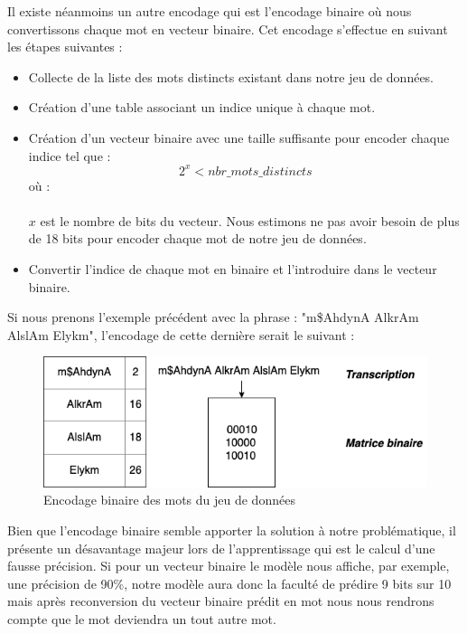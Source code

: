 Il existe néanmoins un autre encodage qui est l'encodage binaire où nous convertissons chaque mot en vecteur binaire. Cet encodage s'effectue en suivant les étapes suivantes :
\begin{itemize}
    \item Collecte de la liste des mots distincts existant dans notre jeu de données.
    \item Création d'une table associant un indice unique à chaque mot.
    \item Création d'un vecteur binaire avec une taille suffisante pour encoder chaque indice tel que :
    \begin{equation}
        2^{x} < nbr\_mots\_distincts
    \end{equation}
    où :\\ \\
    $x$ est le nombre de bits du vecteur.
    Nous estimons ne pas avoir besoin de plus de 18 bits pour encoder chaque mot de notre jeu de données.
    \item Convertir l'indice de chaque mot en binaire et l'introduire dans le vecteur binaire. \\
\end{itemize}

Si nous prenons l'exemple précédent avec la phrase : "m\$AhdynA AlkrAm AlslAm Elykm", l'encodage de cette dernière serait le suivant : 

\begin{figure}[H]
    \centering
    \includegraphics[width=400pt]{images/chap3/Binaire.png}
    \caption{Encodage binaire des mots du jeu de données}
\end{figure}

Bien que l'encodage binaire semble apporter la solution à notre problématique, il présente un désavantage majeur lors de l'apprentissage qui est le calcul d'une fausse précision. Si pour un vecteur binaire le modèle nous affiche, par exemple, une précision de 90\%, notre modèle aura donc la faculté de prédire 9 bits sur 10 mais après reconversion du vecteur binaire prédit en mot nous nous rendrons compte que le mot deviendra un tout autre mot.

